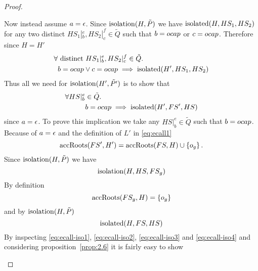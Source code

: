 \begin{proof}
\begin{description}
\begin{description}
          Now instead assume $a = \mbox{$\epsilon$}$. Since $\mbox{$\mathrm{isolation}$}(H, \tilde{P})$ we have
          $\mbox{$\mathrm{isolated}$}(H, HS_1, HS_2)$ for any two distinct $HS_1|_b^e, HS_2|_c^f
          \in \tilde{Q}$ such that $b = \mbox{$ocap$}$ or $c = \mbox{$ocap$}$. Therefore since $H = H'$
          \begin{equation}
            \begin{aligned}
              \forall &\text{ distinct } HS_1|_b^e, HS_2|_c^f \in \tilde{Q}. \\ 
              & b = \mbox{$ocap$} \lor c = \mbox{$ocap$} \implies \mbox{$\mathrm{isolated}$}(H', HS_1, HS_2)
            \end{aligned}
          \end{equation}
          Thus all we need for $\mbox{$\mathrm{isolation}$}(H', \tilde{P'})$ is to show that
          \begin{equation}
            \begin{aligned}
              \forall HS|_b^e &\in \tilde{Q} . \\
              &b = \mbox{$ocap$} \implies \mbox{$\mathrm{isolated}$}(H', FS', HS)
            \end{aligned}
          \end{equation}
          since $a = \mbox{$\epsilon$}$. To prove this implication we take any $HS|_b^e \in
          \tilde{Q}$ such that $b = \mbox{$ocap$}$. Because of $a = \mbox{$\epsilon$}$ and the
          definition of $L'$ in \eqref{eq:ecall1}
          \begin{equation} \label{eq:ecall-iso1}
            \mbox{$\mathrm{accRoots}$}(FS', H') = \mbox{$\mathrm{accRoots}$}(FS, H) \cup \left\{ o_g \right\}.
          \end{equation}
          Since $\mbox{$\mathrm{isolation}$}(H, \tilde{P})$ we have
          \begin{equation} \label{eq:ecall-iso2}
            \mbox{$\mathrm{isolation}$}(H, HS, FS_g)
          \end{equation}
          By definition
          \begin{equation} \label{eq:ecall-iso3}
            \mbox{$\mathrm{accRoots}$}(FS_g, H) = \left\{o_g \right\}
          \end{equation}
          and by $\mbox{$\mathrm{isolation}$}(H, \tilde{P})$ 
          \begin{equation} \label{eq:ecall-iso4}
            \mbox{$\mathrm{isolated}$}(H, FS, HS)
          \end{equation}
          By inspecting \eqref{eq:ecall-iso1}, \eqref{eq:ecall-iso2},
          \eqref{eq:ecall-iso3} and \eqref{eq:ecall-iso4} and considering
          proposition~\ref{prop:2.6} it is fairly easy to show
          \begin{equation}

\end{equation}
\end{description}
\end{description}
\end{proof}
